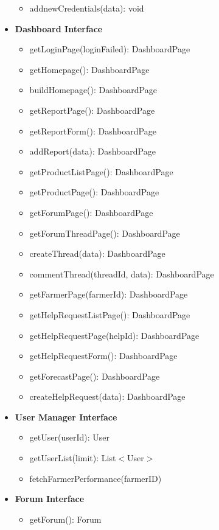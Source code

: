 \documentclass[10pt]{article} %
\begin{document}
\begin{itemize}
\begin{itemize}
        \item addnewCredentials(data): void
    \end{itemize}
    \item \textbf{Dashboard Interface}
    \begin{itemize}
        \item getLoginPage(loginFailed): DashboardPage
        \item getHomepage(): DashboardPage
        \item buildHomepage(): DashboardPage
        \item getReportPage(): DashboardPage
        \item getReportForm(): DashboardPage
        \item addReport(data): DashboardPage
        \item getProductListPage(): DashboardPage
        \item getProductPage(): DashboardPage
        \item getForumPage(): DashboardPage
        \item getForumThreadPage(): DashboardPage
        \item createThread(data): DashboardPage
        \item commentThread(threadId, data): DashboardPage 
        \item getFarmerPage(farmerId): DashboardPage
        \item getHelpRequestListPage(): DashboardPage
        \item getHelpRequestPage(helpId): DashboardPage
        \item getHelpRequestForm(): DashboardPage
        \item getForecastPage(): DashboardPage
        \item createHelpRequest(data): DashboardPage
    \end{itemize}
    \item \textbf{User Manager Interface}
    \begin{itemize}
        \item getUser(userId): User
        \item getUserList(limit): List$<$User$>$ 
        \item fetchFarmerPerformance(farmerID)
    \end{itemize}
    \item \textbf{Forum Interface}
    \begin{itemize}
        \item getForum(): Forum

\end{itemize}
\end{itemize}
\end{document}
